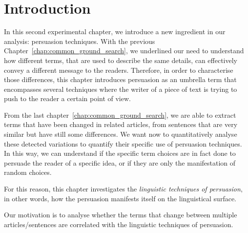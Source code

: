 \label{chap:linguistic_persuasion}

\section{\statusgreen Introduction}
\label{sec:lp_intro}

In this second experimental chapter, we introduce a new ingredient in our analysis: persuasion techniques.
With the previous Chapter~\ref{chap:common_ground_search}, we underlined our need to understand how different terms, that are used to describe the same details, can effectively convey a different message to the readers.
Therefore, in order to characterise those differences, this chapter introduces \gls{persuasion} as an umbrella term that encompasses several techniques where the writer of a piece of text is trying to push to the reader a certain point of view.

From the last chapter~\ref{chap:common_ground_search}, 
we are able to extract terms that have been changed in related articles, from sentences that are very similar but have still some differences.
We want now to quantitatively analyse these detected variations to quantify their specific use of persuasion techniques.
In this way, we can understand if the specific term choices are in fact done to persuade the reader of a specific idea, or if they are only the manifestation of random choices.

For this reason, this chapter investigates the \emph{linguistic techniques of persuasion}, in other words, how the persuasion manifests itself on the linguistical surface.

Our motivation is to analyse whether the terms that change between multiple articles/sentences are correlated with the linguistic techniques of persuasion.


